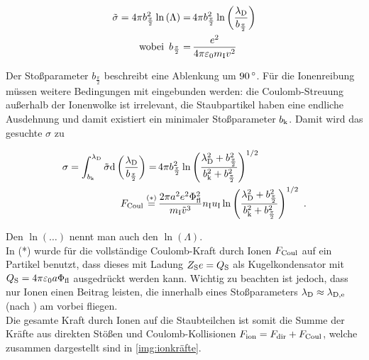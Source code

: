         \begin{align}
          \tilde{\sigma}=4\pi b_{\frac{\pi}{2}}^2\ln\left(\Lambda\right)=&\,4\pi b_{\frac{\pi}{2}}^2\ln\left(\frac{\lambda_\text{D}}{b_{\frac{\pi}{2}}}\right) \\
          \text{wobei }\, b_{\frac{\pi}{2}}=&\,\frac{e^2}{4\pi\varepsilon_\text{0}m_\text{I}v^2} \nonumber
        \end{align}

      Der Stoßparameter $b_{\frac{\pi}{2}}$ beschreibt eine Ablenkung um $\unit[90]{\degree}$. Für die Ionenreibung müssen weitere Bedingungen mit eingebunden werden: die Coulomb-Streuung außerhalb der Ionenwolke ist irrelevant, die Staubpartikel haben eine endliche Ausdehnung und damit existiert ein minimaler Stoßparameter $b_\text{k}$. Damit wird das gesuchte $\sigma$ zu

        \begin{align}
          \sigma=\int_{b_\text{k}}^{\lambda_\text{D}}\tilde{\sigma}\textnormal{d}\left(\frac{\lambda_\text{D}}{b_{\frac{\pi}{2}}}\right)=&\,4\pi b_{\frac{\pi}{2}}^2\ln\left(\frac{\lambda_\text{D}^2+b_{\frac{\pi}{2}}^2}{b_\text{k}^2+b_{\frac{\pi}{2}}^2}\right)^{1/2} \nonumber \\
          F_\text{Coul}\overset{(*)}{=}&\,\frac{2\pi a^2 e^2\Phi_\text{fl}^2}{m_\text{I}\tilde{v}^3}n_\text{I}u_\text{I}\ln\left(\frac{\lambda_\text{D}^2+b_{\frac{\pi}{2}}^2}{b_\text{k}^2+b_{\frac{\pi}{2}}^2}\right)^{1/2} \, \, .
        \end{align}

      Den $\ln\left(\dots\right)$ nennt man auch den  $\ln\left(\Lambda\right)$.\\
      In (*) wurde für die vollständige Coulomb-Kraft durch Ionen $F_\text{Coul}$ auf ein Partikel benutzt, dass dieses mit Ladung $Z_\text{S}e=Q_\text{S}$ als Kugelkondensator mit $Q_\text{S}=4\pi\varepsilon_\text{0}a\Phi_\text{fl}$ ausgedrückt werden kann. Wichtig zu beachten ist jedoch, dass nur Ionen einen Beitrag leisten, die innerhalb eines Stoßparameters $\lambda_\text{D}\approx\lambda_\text{D,e}$ (nach \cite{Kilgore93}) am  vorbei fliegen.\\
      Die gesamte Kraft durch Ionen auf die Staubteilchen ist somit die Summe der Kräfte aus direkten Stößen und Coulomb-Kollisionen $F_\text{ion}=F_\text{dir}+F_\text{Coul}$, welche zusammen dargestellt sind in \autoref{img:ionkräfte}.


